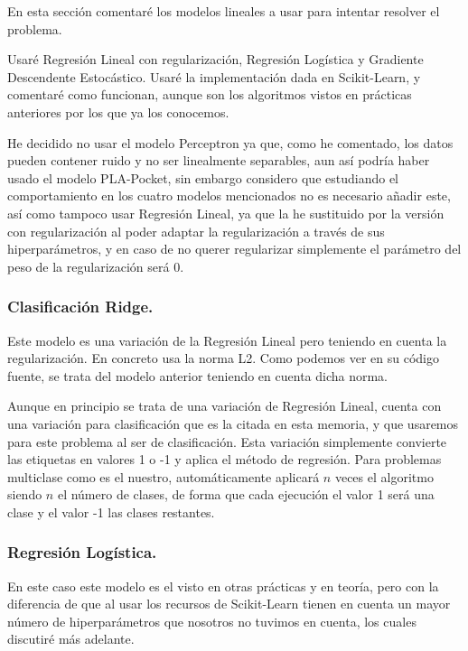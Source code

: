\documentclass[12pt, spanish]{article}
\begin{document}
En esta sección comentaré los modelos lineales a usar para intentar resolver el problema.

Usaré Regresión Lineal con regularización, Regresión Logística y Gradiente Descendente Estocástico. Usaré la implementación dada en Scikit-Learn\cite{scikitlearnlinearmodels}, y comentaré como funcionan, aunque son los algoritmos vistos en prácticas anteriores por los que ya los conocemos.

He decidido no usar el modelo Perceptron ya que, como he comentado, los datos pueden contener ruido y no ser linealmente separables, aun así podría haber usado el modelo PLA-Pocket, sin embargo considero que estudiando el comportamiento en los cuatro modelos mencionados no es necesario añadir este, así como tampoco usar Regresión Lineal, ya que la he sustituido por la versión con regularización al poder adaptar la regularización a través de sus hiperparámetros, y en caso de no querer regularizar simplemente el parámetro del peso de la regularización será 0.


\subsubsection{Clasificación Ridge.}

Este modelo es una variación de la Regresión Lineal pero teniendo en cuenta la regularización. En concreto usa la norma L2. Como podemos ver en su código fuente\cite{sourceRidge}, se trata del modelo anterior teniendo en cuenta dicha norma.

Aunque en principio se trata de una variación de Regresión Lineal, cuenta con una variación para clasificación que es la citada en esta memoria, y que usaremos para este problema al ser de clasificación. Esta variación simplemente convierte las etiquetas en valores 1 o -1 y aplica el método de regresión. Para problemas multiclase como es el nuestro, automáticamente  aplicará $n$ veces el algoritmo siendo $n$ el número de clases, de forma que cada ejecución el valor 1 será una clase y el valor -1 las clases restantes.


\subsubsection{Regresión Logística.}

En este caso este modelo es el visto en otras prácticas y en teoría, pero con la diferencia de que al usar los recursos de Scikit-Learn\cite{sourceLogistic} tienen en cuenta un mayor número de hiperparámetros que nosotros no tuvimos en cuenta, los cuales discutiré más adelante.
\end{document}
